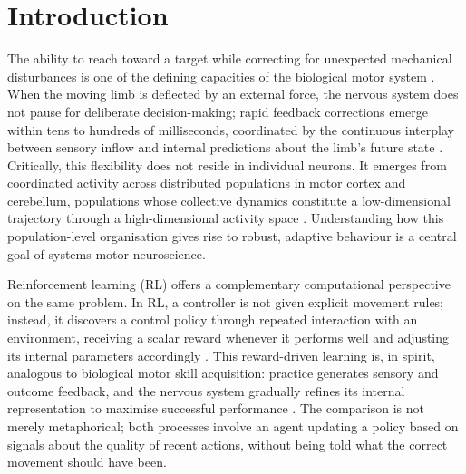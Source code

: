 \documentclass{article}
\begin{document}
\section{Introduction}

The ability to reach toward a target while correcting for unexpected
mechanical disturbances is one of the defining capacities of the biological
motor system \citep{Pruszynski2012,Nashed2014,Dimitriou2013,Scott2004}.
When the moving limb is deflected by an external force, the nervous system
does not pause for deliberate decision-making; rapid feedback corrections
emerge within tens to hundreds of milliseconds, coordinated by the
continuous interplay between sensory inflow and internal predictions about
the limb's future state
\citep{Todorov2002,Todorov2009,Codol2023,FlashHogan1985}.
Critically, this flexibility does not reside in individual neurons.
It emerges from coordinated activity across distributed populations in
motor cortex and cerebellum, populations whose collective dynamics
constitute a low-dimensional trajectory through a high-dimensional
activity space
\citep{Churchland2012,Shenoy2013,Gallego2017,Crevecoeur2019,Blohm2009,Georgopoulos1986,Kalaska1989}.
Understanding how this population-level organisation gives rise to robust,
adaptive behaviour is a central goal of systems motor neuroscience.

Reinforcement learning (RL) offers a complementary computational
perspective on the same problem.
In RL, a controller is not given explicit movement rules; instead, it
discovers a control policy through repeated interaction with an environment,
receiving a scalar reward whenever it performs well and adjusting its
internal parameters accordingly
\citep{Kaelbling1996RLSurvey,SuttonBarto2018,Schulman2017}.
This reward-driven learning is, in spirit, analogous to biological motor
skill acquisition: practice generates sensory and outcome feedback, and the
nervous system gradually refines its internal representation to maximise
successful performance \citep{Oby2019,Mathis2024,Shadmehr1994,WolpertGhahramani2000,Krakauer2019}.
The comparison is not merely metaphorical; both processes involve an agent
updating a policy based on signals about the quality of recent actions,
without being told what the correct movement should have been.
\end{document}
